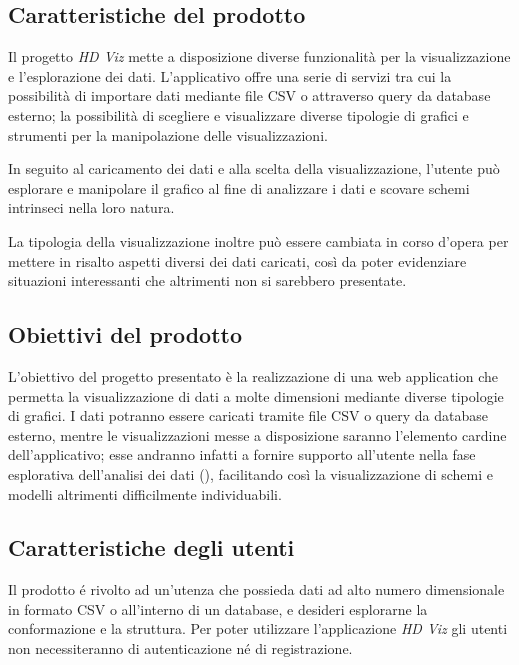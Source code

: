 \documentclass[../analisi-dei-requisiti.tex]{subfiles}
\begin{document}
\subsection{Caratteristiche del prodotto}
\label{sub:caratteristiche_del_prodotto}
Il progetto \emph{HD Viz} mette a disposizione diverse funzionalità per la visualizzazione e l'esplorazione dei
dati. L'applicativo offre una serie di servizi tra cui la possibilità di importare dati mediante file CSV o attraverso query da database esterno; la possibilità di scegliere e visualizzare diverse tipologie di grafici e strumenti per la manipolazione delle visualizzazioni.

In seguito al caricamento dei dati e alla scelta della visualizzazione, l'utente può esplorare e manipolare il grafico
al fine di analizzare i dati e scovare schemi intrinseci nella loro natura.

La tipologia della visualizzazione inoltre può essere cambiata in corso d'opera per mettere in risalto aspetti diversi
dei dati caricati, così da poter evidenziare situazioni interessanti che altrimenti non si sarebbero presentate.

\subsection{Obiettivi del prodotto}
\label{sub:obiettivo_del_prodotto}
L'obiettivo del progetto presentato è la realizzazione di una web application che permetta la visualizzazione di dati a
molte dimensioni mediante diverse tipologie di grafici.
I dati potranno essere caricati tramite file CSV o query da database esterno, mentre le visualizzazioni messe a
disposizione saranno l'elemento cardine dell'applicativo; esse andranno infatti a fornire supporto all'utente
nella fase esplorativa dell'analisi dei dati (), facilitando così la visualizzazione di schemi e modelli
altrimenti difficilmente individuabili.

\subsection{Caratteristiche degli utenti}
\label{sub:caratteristiche_degli_utenti}

Il prodotto é rivolto ad un'utenza che possieda dati ad alto numero dimensionale in formato CSV o all'interno di un
database, e desideri esplorarne la conformazione e la struttura. Per poter utilizzare l'applicazione \emph{HD Viz} gli
utenti non necessiteranno di autenticazione né di registrazione.
\end{document}
